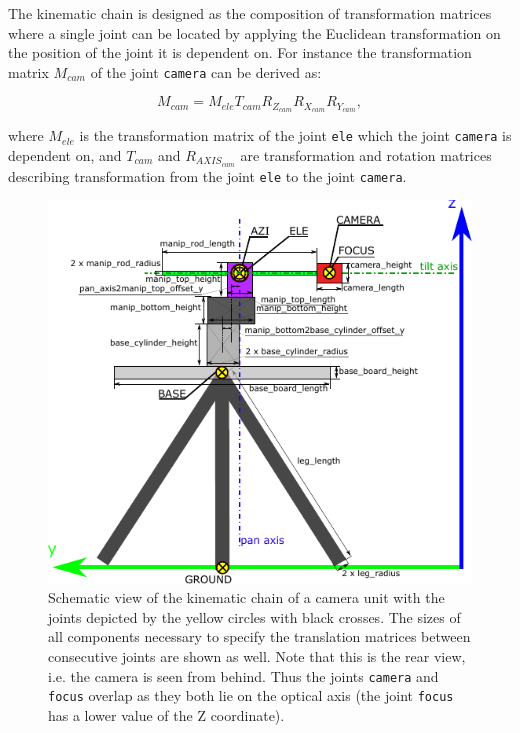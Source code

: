 The kinematic chain is designed as the composition of transformation matrices where a single joint can be located by applying the Euclidean transformation on the position of the joint it is dependent on. For instance the transformation matrix $M_{cam}$ of the joint \texttt{camera} can be derived as:

\begin{equation}
M_{cam} = M_{ele}T_{cam}R_{Z_{cam}}R_{X_{cam}}R_{Y_{cam}},
\end{equation}

where $M_{ele}$ is the transformation matrix of the joint \texttt{ele} which the joint \texttt{camera} is dependent on, and $T_{cam}$ and $R_{AXIS_{cam}}$ are transformation and rotation matrices describing transformation from the joint \texttt{ele} to the joint \texttt{camera}. 

\begin{figure}[htb]
	\centering
	\includegraphics[width=14cm]{fig/camera_unit_kinematic_chain.pdf}
	\caption{Schematic view of the kinematic chain of a camera unit with the joints depicted by the yellow circles with black crosses. The sizes of all components necessary to specify the translation matrices between consecutive joints are shown as well. Note that this is the rear view, i.e. the camera is seen from behind. Thus the joints \texttt{camera} and \texttt{focus} overlap as they both lie on the optical axis (the joint \texttt{focus} has a lower value of the Z coordinate).}
	\label{fig:camera_unit_kinematic_chain}
\end{figure}


